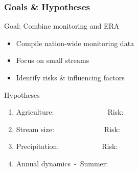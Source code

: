 \documentclass[
	12pt
	]{beamer}
\begin{document}
\begin{frame}
\frametitle{Goals \& Hypotheses}
	\begin{exampleblock}{Goal: Combine monitoring and ERA}
		\begin{itemize}
			\item Compile nation-wide monitoring data %
			\item Focus on small streams
			\item Identify risks \& influencing factors
		\end{itemize}
	\end{exampleblock}
	\pause
	\begin{exampleblock}{Hypotheses}
		\begin{enumerate}
			\item Agriculture:~~~~~\textbf{\Large\textuparrow}~~~~~~~~~~Risk: \textbf{\Large\textuparrow}
			\pause
			\item Stream size:~~~~\textbf{\Large\textdownarrow}~~~~~~~~~~Risk: \textbf{\Large\textuparrow}
			\pause
			\item Precipitation:~~\textbf{\Large\textuparrow}~~~~~~~~~~Risk: \textbf{\Large\textuparrow}
			\pause
			\item Annual dynamics~-~Summer: \textbf{\Large\textuparrow}
		\end{enumerate}
	\end{exampleblock}
\end{frame}
\end{document}
